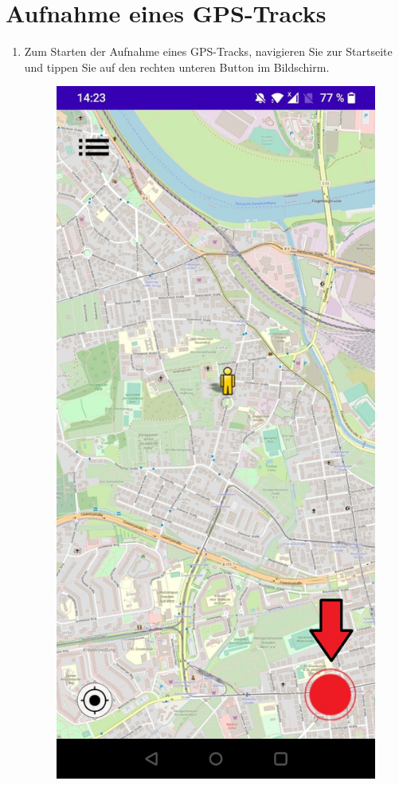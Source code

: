 \documentclass{article}
\begin{document}
\section{Aufnahme eines GPS-Tracks}
\begin{enumerate}
\item Zum Starten der Aufnahme eines GPS-Tracks, navigieren Sie zur Startseite und tippen Sie auf den rechten unteren Button im Bildschirm.
	\begin{figure}[H]
		\includegraphics[scale=0.25]{14_aufnahmeStart.jpg}

\end{figure}
\end{enumerate}
\end{document}
